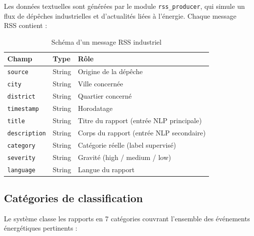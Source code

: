 \documentclass[12pt,a4paper]{report}
\begin{document}
Les donn\'{e}es textuelles sont g\'{e}n\'{e}r\'{e}es par le module \texttt{rss\_producer}, qui simule un flux de d\'{e}p\^{e}ches industrielles et d'actualit\'{e}s li\'{e}es \`{a} l'\'{e}nergie. Chaque message RSS contient :

\begin{table}[H]
\centering
\caption{Sch\'{e}ma d'un message RSS industriel}
\label{tab:rss_schema}
\renewcommand{\arraystretch}{1.3}
\begin{tabularx}{\textwidth}{|l|l|X|}
\hline
\rowcolor{primaryblue!20}
\textbf{Champ} & \textbf{Type} & \textbf{R\^{o}le} \\
\hline
\texttt{source} & String & Origine de la d\'{e}p\^{e}che \\
\texttt{city} & String & Ville concern\'{e}e \\
\texttt{district} & String & Quartier concern\'{e} \\
\texttt{timestamp} & String & Horodatage \\
\texttt{title} & String & Titre du rapport (entr\'{e}e NLP principale) \\
\texttt{description} & String & Corps du rapport (entr\'{e}e NLP secondaire) \\
\texttt{category} & String & Cat\'{e}gorie r\'{e}elle (label supervis\'{e}) \\
\texttt{severity} & String & Gravit\'{e} (high / medium / low) \\
\texttt{language} & String & Langue du rapport \\
\hline
\end{tabularx}
\end{table}

\subsection{Cat\'{e}gories de classification}

Le syst\`{e}me classe les rapports en 7 cat\'{e}gories couvrant l'ensemble des \'{e}v\'{e}nements \'{e}nerg\'{e}tiques pertinents :
\end{document}
